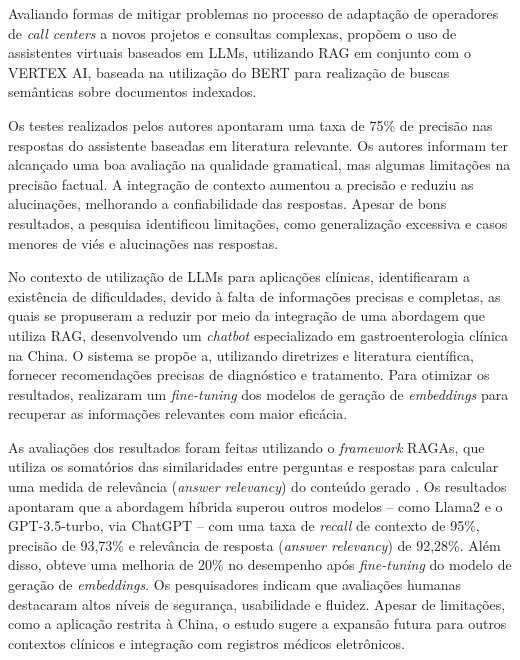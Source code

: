 Avaliando formas de mitigar problemas no processo de adaptação de operadores de \textit{call centers} a novos projetos e consultas complexas,  propõem o uso de assistentes virtuais baseados em \ac{LLM}s, utilizando \ac{RAG} em conjunto com o VERTEX AI, baseada na utilização do BERT para realização de buscas semânticas sobre documentos indexados.

Os testes realizados pelos autores apontaram uma taxa de 75\% de precisão nas respostas do assistente baseadas em literatura relevante. Os autores informam  ter alcançado uma boa avaliação na qualidade gramatical, mas algumas limitações na precisão factual. A integração de contexto aumentou a precisão e reduziu as alucinações, melhorando a confiabilidade das respostas. Apesar de bons resultados, a pesquisa identificou limitações, como generalização excessiva e casos menores de viés e alucinações nas respostas.

No contexto de utilização de \ac{LLM}s para aplicações clínicas,  identificaram a existência de dificuldades, devido à falta de informações precisas e completas, as quais se propuseram a reduzir por meio da integração de uma abordagem que utiliza \ac{RAG}, desenvolvendo um \textit{chatbot} especializado em gastroenterologia clínica na China. O sistema se propõe a, utilizando diretrizes e literatura científica, fornecer recomendações precisas de diagnóstico e tratamento. Para otimizar os resultados, realizaram um \textit{fine-tuning} dos modelos de geração de \textit{embeddings} para recuperar as informações relevantes com maior eficácia.

As avaliações dos resultados foram feitas utilizando o \textit{framework} RAGAs, que utiliza os somatórios das similaridades entre perguntas e respostas para calcular uma medida de relevância (\textit{answer relevancy}) do conteúdo gerado \cite{RAGAS:1}. Os resultados apontaram que a abordagem híbrida superou outros modelos -- como Llama2 e o GPT-3.5-turbo, via ChatGPT -- com uma taxa de \textit{recall} de contexto de 95\%, precisão de 93,73\% e relevância de resposta (\textit{answer relevancy}) de 92,28\%. Além disso, obteve uma melhoria de 20\% no desempenho após \textit{fine-tuning} do modelo de geração de \textit{embeddings}. Os pesquisadores indicam que avaliações humanas destacaram altos níveis de segurança, usabilidade e fluidez. Apesar de limitações, como a aplicação restrita à China, o estudo sugere a expansão futura para outros contextos clínicos e integração com registros médicos eletrônicos.

